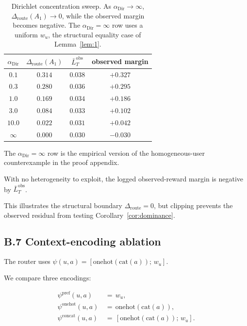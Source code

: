 \documentclass{article} %
\begin{document}
\begin{table}[h]
\centering
\small
\begin{tabular}{cccc}
\toprule
\(\alpha_{\mathrm{Dir}}\) & $\Delta_{\mathrm{route}}(A_1)$ & $\bar L_T^{\mathrm{obs}}$ & observed margin \\
\midrule
$0.1$  & $0.314$ & $0.038$ & $+0.327$ \\
$0.3$  & $0.280$ & $0.036$ & $+0.295$ \\
$1.0$  & $0.169$ & $0.034$ & $+0.186$ \\
$3.0$  & $0.084$ & $0.033$ & $+0.102$ \\
$10.0$ & $0.022$ & $0.031$ & $+0.042$ \\
$\infty$ & $0.000$ & $0.030$ & $-0.030$ \\
\bottomrule
\end{tabular}
\caption{Dirichlet concentration sweep. As
\(\alpha_{\mathrm{Dir}}\to\infty\),
\(\Delta_{\mathrm{route}}(A_1)\to0\), while the observed margin becomes
negative. The \(\alpha_{\mathrm{Dir}}=\infty\) row uses a uniform \(w_u\), the structural
equality case of Lemma~\ref{lem:1}.}
\label{tab:app-dirichlet}
\end{table}

The \(\alpha_{\mathrm{Dir}}=\infty\) row is the empirical version of the
homogeneous-user counterexample in the proof appendix.

With no heterogeneity to exploit, the logged observed-reward margin is negative
by \(\bar L_T^{\mathrm{obs}}\).

This illustrates the structural boundary \(\Delta_{\mathrm{route}}=0\), but
clipping prevents the observed residual from testing
Corollary~\ref{cor:dominance}.

\subsection{B.7 Context-encoding ablation}

\label{app:ctx-type}

The router uses $\psi(u,a)=[\mathrm{onehot}(\mathrm{cat}(a));\,w_u]$.

We compare three encodings:

\begin{align}
\label{eq:app-ctx-pref}
\psi^{\mathrm{pref}}(u,a) &\,=\, w_u,\\
\label{eq:app-ctx-onehot}
\psi^{\mathrm{onehot}}(u,a) &\,=\, \mathrm{onehot}(\mathrm{cat}(a)),\\
\label{eq:app-ctx-concat}
\psi^{\mathrm{concat}}(u,a) &\,=\, [\mathrm{onehot}(\mathrm{cat}(a));\,w_u].
\end{align}
\end{document}

